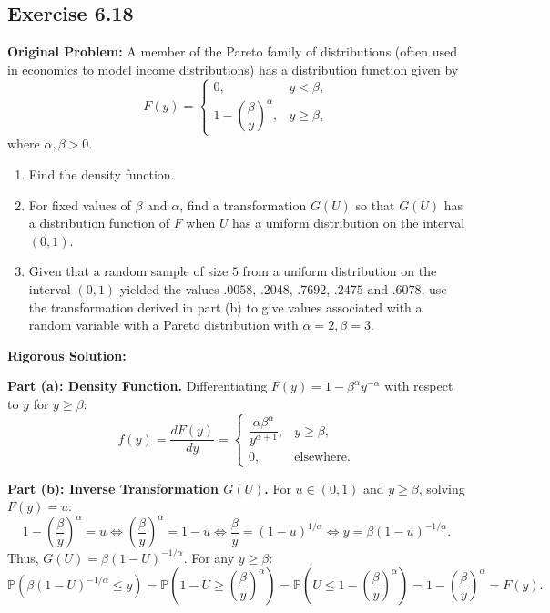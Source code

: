 \documentclass[11pt, letterpaper]{article}
\theoremstyle{definition}
\theoremstyle{remark}
\newcommand{\Prob}{\mathbb{P}}
\begin{document}
\subsection{Exercise 6.18}

\textbf{Original Problem:}
A member of the Pareto family of distributions (often used in economics to model income distributions) has a distribution function given by
\[
    F(y) = \begin{cases} 0, & y < \beta, \\ 1 - \left(\dfrac{\beta}{y}\right)^\alpha, & y \ge \beta, \end{cases}
\]
where $\alpha, \beta > 0$.
\begin{enumerate}[label=\textbf{\alph*}]
    \item Find the density function.
    \item For fixed values of $\beta$ and $\alpha$, find a transformation $G(U)$ so that $G(U)$ has a distribution function of $F$ when $U$ has a uniform distribution on the interval $(0, 1)$.
    \item Given that a random sample of size $5$ from a uniform distribution on the interval $(0, 1)$ yielded the values $.0058$, $.2048$, $.7692$, $.2475$ and $.6078$, use the transformation derived in part (b) to give values associated with a random variable with a Pareto distribution with $\alpha = 2, \beta = 3$.
\end{enumerate}

\hrulefill

\textbf{Rigorous Solution:}

\textbf{Part (a): Density Function.}
Differentiating $F(y) = 1 - \beta^\alpha y^{-\alpha}$ with respect to $y$ for $y \ge \beta$:
\[
    f(y) = \frac{dF(y)}{dy} = \begin{cases} \dfrac{\alpha \beta^\alpha}{y^{\alpha + 1}}, & y \ge \beta, \\[6pt] 0, & \text{elsewhere.} \end{cases}
\]

\textbf{Part (b): Inverse Transformation $G(U)$.}
For $u \in (0, 1)$ and $y \ge \beta$, solving $F(y) = u$:
\[
    1 - \left(\frac{\beta}{y}\right)^\alpha = u \iff \left(\frac{\beta}{y}\right)^\alpha = 1 - u \iff \frac{\beta}{y} = (1 - u)^{1/\alpha} \iff y = \beta(1 - u)^{-1/\alpha}.
\]
Thus, $G(U) = \beta(1 - U)^{-1/\alpha}$. For any $y \ge \beta$:
\[
    \Prob\left(\beta(1 - U)^{-1/\alpha} \le y\right) = \Prob\left(1 - U \ge \left(\frac{\beta}{y}\right)^\alpha\right) = \Prob\left(U \le 1 - \left(\frac{\beta}{y}\right)^\alpha\right) = 1 - \left(\frac{\beta}{y}\right)^\alpha = F(y).
\]
\end{document}
